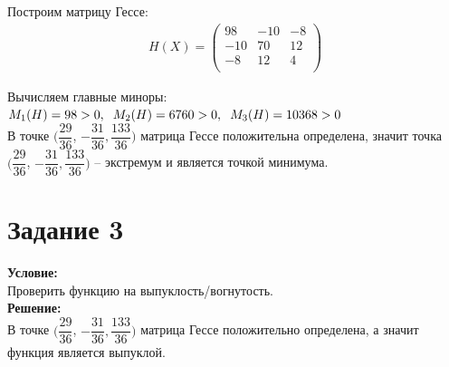\documentclass[14pt,a4paper,fleqn]{extarticle}
\begin{document}
	Построим матрицу Гессе:
	\begin{align*}
		H(X) = \begin{pmatrix}
			98 & -10 & -8\\
			-10 & 70 & 12\\
			-8 & 12 & 4\\
		\end{pmatrix}
	\end{align*}
	
	Вычисляем главные миноры:\\
	$M_1(H) = 98 > 0, \hspace*{0.2cm} M_2(H) = 6760 > 0, \hspace*{0.2cm} M_3(H) = 10368 > 0$\\
	
	В точке $(\dfrac{29}{36}$, $-\dfrac{31}{36}, \dfrac{133}{36})$ матрица Гессе положительна определена, значит точка $(\dfrac{29}{36}$, $-\dfrac{31}{36}, \dfrac{133}{36})$ -- экстремум и является точкой минимума.
	
	\section*{Задание 3}
	\textbf{Условие:}\\
	Проверить функцию на выпуклость/вогнутость.\\
	
	\textbf{Решение:}\\
	
	В точке $(\dfrac{29}{36}$, $-\dfrac{31}{36}, \dfrac{133}{36})$ матрица Гессе положительно определена, а значит функция является выпуклой.
\end{document}

